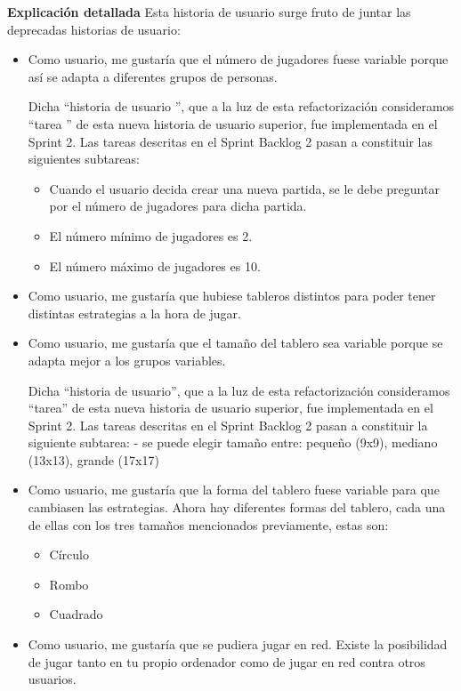 \documentclass[../../SCRUM.tex]{subfiles}
\begin{document}
\textbf{Explicación detallada}
Esta historia de usuario surge fruto de juntar las deprecadas historias de usuario:
\begin{itemize}
\item  Como usuario, me gustaría que el número de jugadores fuese variable porque así se adapta a diferentes grupos de personas. 

    Dicha  ``historia de usuario '', que a la luz de esta refactorización consideramos  ``tarea '' de esta nueva historia de usuario superior, fue implementada en el Sprint 2. Las tareas descritas en el Sprint Backlog 2 pasan a constituir las siguientes subtareas:
    \begin{itemize}
  	  \item Cuando el usuario decida crear una nueva partida, se le debe preguntar por el número de jugadores para dicha partida.
      \item El número mínimo de jugadores es 2.
      \item El número máximo de jugadores es 10.
    \end{itemize}

\item  Como usuario, me gustaría que hubiese tableros distintos para poder tener distintas estrategias a la hora de jugar. 

\item  Como usuario, me gustaría que el tamaño del tablero sea variable porque se adapta mejor a los grupos variables. 

    Dicha  ``historia de usuario'', que a la luz de esta refactorización consideramos  ``tarea'' de esta nueva historia de usuario superior, fue implementada en el Sprint 2. Las tareas descritas en el Sprint Backlog 2 pasan a constituir la siguiente subtarea:
     - se puede elegir tamaño entre: pequeño (9x9), mediano (13x13), grande (17x17)

\item  Como usuario, me gustaría que la forma del tablero fuese variable para que cambiasen las estrategias. 
    Ahora hay diferentes formas del tablero, cada una de ellas con los tres tamaños mencionados previamente, estas son:
    \begin{itemize}
    	\item Círculo
    	\item Rombo
    	\item Cuadrado
    \end{itemize}

\item  Como usuario, me gustaría que se pudiera jugar en red. 
    Existe la posibilidad de jugar tanto en tu propio ordenador como de jugar en red contra otros usuarios.


\end{itemize}
\end{document}
